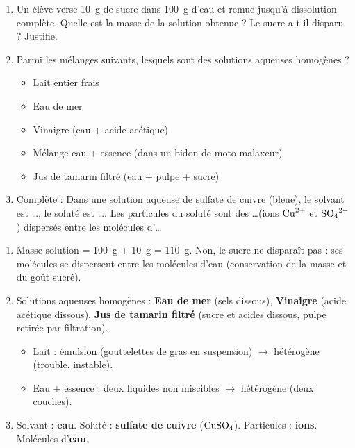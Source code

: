 \documentclass[11pt]{article}
\begin{document}
\begin{exercice}
\begin{enumerate}
    \item Un élève verse \SI{10}{g} de sucre dans \SI{100}{g} d'eau et remue jusqu'à dissolution complète. Quelle est la masse de la solution obtenue ? Le sucre a-t-il disparu ? Justifie.
    \item Parmi les mélanges suivants, lesquels sont des solutions aqueuses homogènes ?
    \begin{itemize}
        \item Lait entier frais
        \item Eau de mer
        \item Vinaigre (eau + acide acétique)
        \item Mélange eau + essence (dans un bidon de moto-malaxeur)
        \item Jus de tamarin filtré (eau + pulpe + sucre)
    \end{itemize}
    \item Complète : Dans une solution aqueuse de sulfate de cuivre (bleue), le solvant est \ldots, le soluté est \ldots. Les particules du soluté sont des \ldots (ions $\ce{Cu^{2+}}$ et $\ce{SO4^{2-}}$) dispersés entre les molécules d'\ldots
\end{enumerate}
\end{exercice}

\begin{corrige}[Exercice n°1]
\begin{enumerate}
    \item Masse solution = \SI{100}{g} + \SI{10}{g} = \SI{110}{g}. Non, le sucre ne disparaît pas : ses molécules se dispersent entre les molécules d'eau (conservation de la masse et du goût sucré).
    \item Solutions aqueuses homogènes : \textbf{Eau de mer} (sels dissous), \textbf{Vinaigre} (acide acétique dissous), \textbf{Jus de tamarin filtré} (sucre et acides dissous, pulpe retirée par filtration).
    \begin{itemize}
        \item Lait : émulsion (gouttelettes de gras en suspension) $\rightarrow$ hétérogène (trouble, instable).
        \item Eau + essence : deux liquides non miscibles $\rightarrow$ hétérogène (deux couches).
    \end{itemize}
    \item Solvant : \textbf{eau}. Soluté : \textbf{sulfate de cuivre} ($\ce{CuSO4}$). Particules : \textbf{ions}. Molécules d'\textbf{eau}.
\end{enumerate}
\end{corrige}
\end{document}
